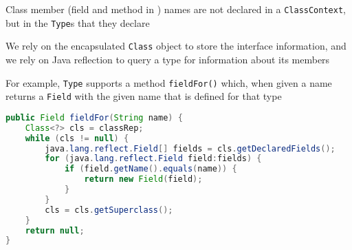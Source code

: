 \documentclass[8pt,a4paper,compress]{beamer}
\begin{document}
\begin{frame}[fragile]
\pause

Class member (field and method in \jmm) names are not declared in a \lstinline{ClassContext}, but in the \lstinline{Type}s that they declare

\pause
\bigskip

We rely on the encapsulated \lstinline{Class} object to store the interface information, and we rely on Java reflection to query a type for information about its members

\pause
\bigskip

For example, \lstinline{Type} supports a method \lstinline{fieldFor()} which, when given a name returns a \lstinline{Field} with the given name that is defined for that type

\begin{lstlisting}[language=Java]
public Field fieldFor(String name) {
    Class<?> cls = classRep;
    while (cls != null) {
        java.lang.reflect.Field[] fields = cls.getDeclaredFields();
        for (java.lang.reflect.Field field:fields) {
            if (field.getName().equals(name)) {
                return new Field(field);
            }
        }
        cls = cls.getSuperclass();
    }
    return null;
}
\end{lstlisting}
\end{frame}
\end{document}
